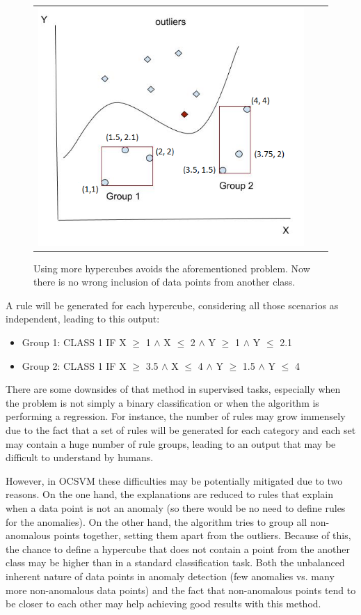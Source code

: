 \begin{figure}[!h]
\centering
  \begin{tabular}{c@{\qquad}c@{\qquad}c}
\includegraphics[width=0.5\columnwidth]{figures/outlier_02.png}
  \end{tabular} 
  \caption{Using more hypercubes avoids the aforementioned problem. Now there is no wrong inclusion of data points from another class.\label{fig:ch2-sota-outlier2}}
\end{figure}

A rule will be generated for each hypercube, considering all those scenarios as independent, leading to this output:
\begin{itemize}
    \setlength{\itemindent}{2em}
    \item Group 1: CLASS 1 IF X $\geq$ 1 $\land$ X $\leq$ 2 $\land$ Y $\geq$ 1 $\land$ Y $\leq$ 2.1\
    \item Group 2: CLASS 1 IF X $\geq$ 3.5 $\land$ X $\leq$ 4 $\land$ Y $\geq$ 1.5 $\land$ Y $\leq$ 4
\end{itemize}

There are some downsides of that method in supervised tasks, especially when the problem is not simply a binary classification or when the algorithm is performing a regression. For instance, the number of rules may grow immensely due to the fact that a set of rules will be generated for each category and each set may contain a huge number of rule groups, leading to an output that may be difficult to understand by humans.

However, in OCSVM these difficulties may be potentially mitigated due to two reasons. On the one hand, the explanations are reduced to rules that explain when a data point is not an anomaly (so there would be no need to define rules for the anomalies). On the other hand, the algorithm tries to group all non-anomalous points together, setting them apart from the outliers. Because of this, the chance to define a hypercube that does not contain a point from the another class may be higher than in a standard classification task. Both the unbalanced inherent nature of data points in anomaly detection (few anomalies vs. many more non-anomalous data points) and the fact that non-anomalous points tend to be closer to each other may help achieving good results with this method.

